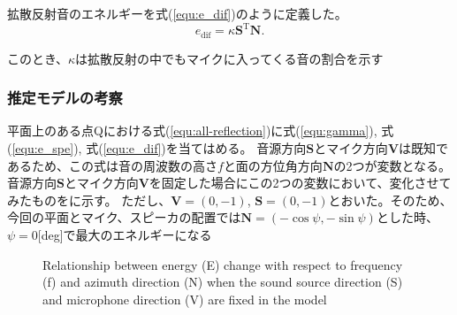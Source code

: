 拡散反射音のエネルギーを式(\ref{equ:e_dif})のように定義した。
\begin{equation}
    \label{equ:e_dif}
    e_\mathrm{dif} = \kappa\mathbf{S}^{\mathrm{T}}\mathbf{N}.
\end{equation}
    
このとき、$\kappa$は拡散反射の中でもマイクに入ってくる音の割合を示す

\subsubsection{推定モデルの考察}
平面上のある点Qにおける式(\ref{equ:all-reflection})に式(\ref{equ:gamma}), 式(\ref{equ:e_spe}), 式(\ref{equ:e_dif})を当てはめる。
音源方向$\mathbf{S}$とマイク方向$\mathbf{V}$は既知であるため、この式は音の周波数の高さ$f$と面の方位角方向$\mathbf{N}$の2つが変数となる。
音源方向$\mathbf{S}$とマイク方向$\mathbf{V}$を固定した場合にこの2つの変数において、変化させてみたものをに示す。
ただし、$\mathbf{V}=(0,-1)$, $\mathbf{S}=(0,-1)$とおいた。そのため、今回の平面とマイク、スピーカの配置では$\mathbf{N} = (-\cos{\psi}, -\sin{\psi})$とした時、$\psi =0$[deg]で最大のエネルギーになる

\begin{figure}[t]
  \centering
  \centering
 \caption{Relationship between energy (E) change with respect to frequency (f) and azimuth direction (N) when the sound source direction (S) and microphone direction (V) are fixed in the model}\label{fig:e_f&N}
\end{figure}

